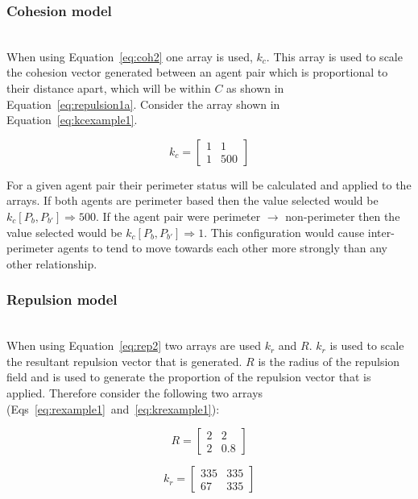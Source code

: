 \documentclass[12pt,a4paper]{IEEEtran}
\newcommand{\kc}{\mathit{k_c}}
\newcommand{\kr}{\mathit{k_r}}
\newcommand{\rb}{\mathit{R}}
\begin{document}
\subsubsection{Cohesion model}~\\
When using Equation~\ref{eq:coh2} one array is used, $k_c$. This array is used to scale the cohesion vector generated between an agent pair which is proportional to their distance apart, which will be within $C$ as shown in Equation~\ref{eq:repulsion1a}. Consider the array shown in Equation~\ref{eq:kcexample1}.

\begin{equation}\label{eq:kcexample1}
	\kc = 
	\begin{bmatrix}
	1 & 1\\
	1 & 500
	\end{bmatrix}
\end{equation}

For a given agent pair their perimeter status will be calculated and applied to the arrays. If both agents are perimeter based then the value selected would be $k_c[P_b,P_{b'}]\Rightarrow 500$. If the agent pair were perimeter $\rightarrow$ non-perimeter then the value selected would be $k_c[P_b,P_{b'}]\Rightarrow 1$. This configuration would cause inter-perimeter agents to tend to move towards each other more strongly than any other relationship.

\subsubsection{Repulsion model}~\\
When using Equation~\ref{eq:rep2} two arrays are used $\kr$ and $\rb$. $\kr$ is used to scale the resultant repulsion vector that is generated. $\rb$ is the radius of the repulsion field and is used to generate the proportion of the repulsion vector that is applied. Therefore consider the following two arrays (Eqs~\ref{eq:rexample1}~and~\ref{eq:krexample1}):

\begin{equation}\label{eq:rexample1}
	\rb = 
	\begin{bmatrix}
	2 & 2\\
	2 & 0.8
	\end{bmatrix}
\end{equation}

\begin{equation}\label{eq:krexample1}
	\kr = 
	\begin{bmatrix}
	335 & 335\\
	67 & 335
	\end{bmatrix}
\end{equation}
\end{document}
